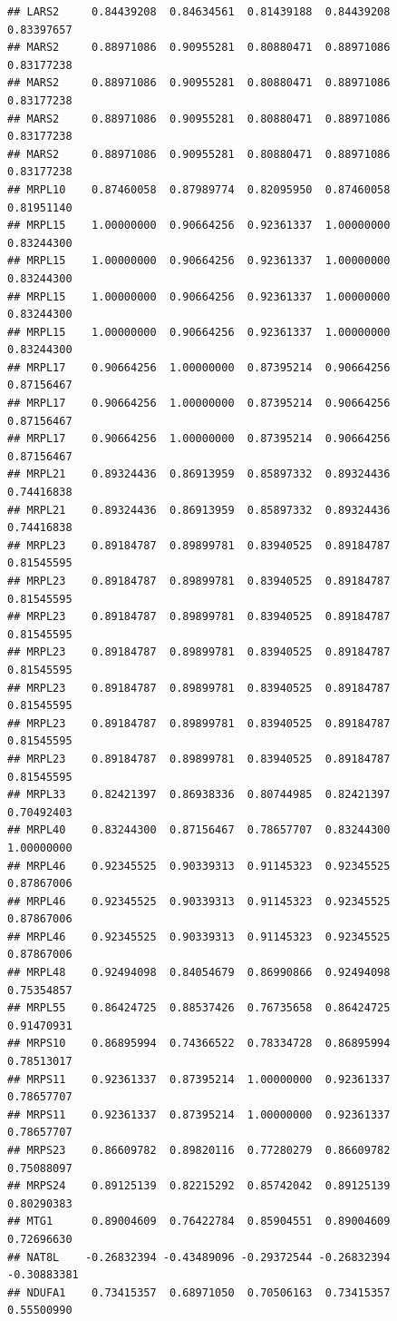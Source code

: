 \documentclass[
]{article}
\begin{document}
\begin{verbatim}
## LARS2     0.84439208  0.84634561  0.81439188  0.84439208  0.83397657
## MARS2     0.88971086  0.90955281  0.80880471  0.88971086  0.83177238
## MARS2     0.88971086  0.90955281  0.80880471  0.88971086  0.83177238
## MARS2     0.88971086  0.90955281  0.80880471  0.88971086  0.83177238
## MARS2     0.88971086  0.90955281  0.80880471  0.88971086  0.83177238
## MRPL10    0.87460058  0.87989774  0.82095950  0.87460058  0.81951140
## MRPL15    1.00000000  0.90664256  0.92361337  1.00000000  0.83244300
## MRPL15    1.00000000  0.90664256  0.92361337  1.00000000  0.83244300
## MRPL15    1.00000000  0.90664256  0.92361337  1.00000000  0.83244300
## MRPL15    1.00000000  0.90664256  0.92361337  1.00000000  0.83244300
## MRPL17    0.90664256  1.00000000  0.87395214  0.90664256  0.87156467
## MRPL17    0.90664256  1.00000000  0.87395214  0.90664256  0.87156467
## MRPL17    0.90664256  1.00000000  0.87395214  0.90664256  0.87156467
## MRPL21    0.89324436  0.86913959  0.85897332  0.89324436  0.74416838
## MRPL21    0.89324436  0.86913959  0.85897332  0.89324436  0.74416838
## MRPL23    0.89184787  0.89899781  0.83940525  0.89184787  0.81545595
## MRPL23    0.89184787  0.89899781  0.83940525  0.89184787  0.81545595
## MRPL23    0.89184787  0.89899781  0.83940525  0.89184787  0.81545595
## MRPL23    0.89184787  0.89899781  0.83940525  0.89184787  0.81545595
## MRPL23    0.89184787  0.89899781  0.83940525  0.89184787  0.81545595
## MRPL23    0.89184787  0.89899781  0.83940525  0.89184787  0.81545595
## MRPL23    0.89184787  0.89899781  0.83940525  0.89184787  0.81545595
## MRPL33    0.82421397  0.86938336  0.80744985  0.82421397  0.70492403
## MRPL40    0.83244300  0.87156467  0.78657707  0.83244300  1.00000000
## MRPL46    0.92345525  0.90339313  0.91145323  0.92345525  0.87867006
## MRPL46    0.92345525  0.90339313  0.91145323  0.92345525  0.87867006
## MRPL46    0.92345525  0.90339313  0.91145323  0.92345525  0.87867006
## MRPL48    0.92494098  0.84054679  0.86990866  0.92494098  0.75354857
## MRPL55    0.86424725  0.88537426  0.76735658  0.86424725  0.91470931
## MRPS10    0.86895994  0.74366522  0.78334728  0.86895994  0.78513017
## MRPS11    0.92361337  0.87395214  1.00000000  0.92361337  0.78657707
## MRPS11    0.92361337  0.87395214  1.00000000  0.92361337  0.78657707
## MRPS23    0.86609782  0.89820116  0.77280279  0.86609782  0.75088097
## MRPS24    0.89125139  0.82215292  0.85742042  0.89125139  0.80290383
## MTG1      0.89004609  0.76422784  0.85904551  0.89004609  0.72696630
## NAT8L    -0.26832394 -0.43489096 -0.29372544 -0.26832394 -0.30883381
## NDUFA1    0.73415357  0.68971050  0.70506163  0.73415357  0.55500990

\end{verbatim}
\end{document}
